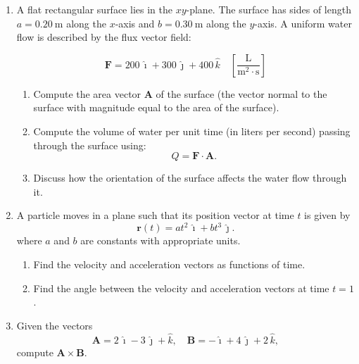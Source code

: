\documentclass[12pt]{article}
\begin{document}
\begin{enumerate}
    \item A flat rectangular surface lies in the $xy$-plane. The surface has sides of length $a = 0.20~\mathrm{m}$ along the $x$-axis and $b = 0.30~\mathrm{m}$ along the $y$-axis. A uniform water flow is described by the flux vector field:

\[
\mathbf{F} = 200\,\hat{\imath} + 300\,\hat{\jmath} + 400\,\hat{k} 
\quad \left[\frac{\mathrm{L}}{\mathrm{m}^2 \cdot \mathrm{s}}\right]
\]

\begin{enumerate}
    \item Compute the area vector $\mathbf{A}$ of the surface (the vector normal to the surface with magnitude equal to the area of the surface).
    \item Compute the volume of water per unit time (in liters per second) passing through the surface using:
    \[
    Q = \mathbf{F} \cdot \mathbf{A}.
    \]
    \item Discuss how the orientation of the surface affects the water flow through it.
\end{enumerate}

    \item A particle moves in a plane such that its position vector at time \(t\) is given by
          \[
            \mathbf{r}(t) = at^2\,\hat{\imath} + bt^3\,\hat{\jmath}.
          \]
          where $a$ and $b$ are constants with appropriate units.
          \begin{enumerate}
            \item Find the velocity and acceleration vectors as functions of time.
            \item Find the angle between the velocity and acceleration vectors at time \(t = 1\).
          \end{enumerate}

    \item Given the vectors
\[
\mathbf{A} = 2\,\hat{\imath} - 3\,\hat{\jmath} + \hat{k}, \quad 
\mathbf{B} = -\hat{\imath} + 4\,\hat{\jmath} + 2\,\hat{k},
\]
compute $\mathbf{A} \times \mathbf{B}$.
    
          
\end{enumerate}
\end{document}
